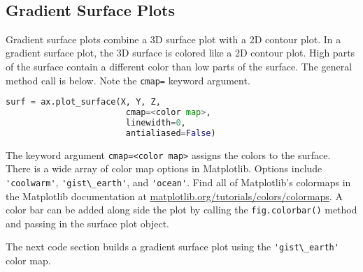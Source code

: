 \documentclass{book}
\newcommand{\passthrough}[1]{#1}
\begin{document}
    \begin{center}
    \end{center}
    { \hspace*{\fill} \\}
    

    
        \hypertarget{gradient-surface-plots}{%
\subsection{Gradient Surface Plots}\label{gradient-surface-plots}}
    




    
        Gradient surface plots combine a 3D surface plot with a 2D contour plot.
In a gradient surface plot, the 3D surface is colored like a 2D contour
plot. High parts of the surface contain a different color than low parts
of the surface. The general method call is below. Note the
\passthrough{\lstinline!cmap=!} keyword argument.

\begin{lstlisting}[language=Python]
surf = ax.plot_surface(X, Y, Z, 
                        cmap=<color map>,
                        linewidth=0,
                        antialiased=False)
\end{lstlisting}

The keyword argument \passthrough{\lstinline!cmap=<color map>!} assigns
the colors to the surface. There is a wide array of color map options in
Matplotlib. Options include \passthrough{\lstinline!'coolwarm'!},
\passthrough{\lstinline!'gist\_earth'!}, and
\passthrough{\lstinline!'ocean'!}. Find all of Matplotlib's colormaps in
the Matplotlib documentation at
\href{https://matplotlib.org/tutorials/colors/colormaps.html}{matplotlib.org/tutorials/colors/colormaps}.
A color bar can be added along side the plot by calling the
\passthrough{\lstinline!fig.colorbar()!} method and passing in the
surface plot object.

The next code section builds a gradient surface plot using the
\passthrough{\lstinline!'gist\_earth'!} color map.
    
\end{document}
